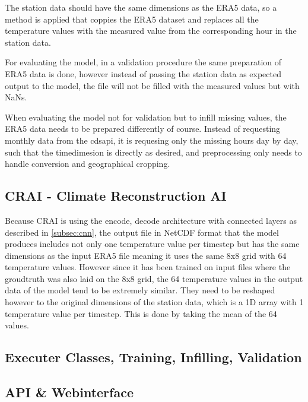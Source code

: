The station data should have the same dimensions as the ERA5 data, so a method is applied that coppies the ERA5 dataset and replaces all the temperature values with the measured value from the corresponding hour in the station data.

For evaluating the model, in a validation procedure the same preparation of ERA5 data is done, however instead of passing the station data as expected output to the model, the file will not be filled with the measured values but with NaNs.

When evaluating the model not for validation but to infill missing values, the ERA5 data needs to be prepared differently of course. Instead of requesting monthly data from the cdsapi, it is requesing only the missing hours day by day, such that the timedimesion is directly as desired, and preprocessing only needs to handle conversion and geographical cropping.

\subsection{CRAI - Climate Reconstruction AI}

Because CRAI is using the encode, decode architecture with connected layers as described in \autoref{subsec:cnn}, the output file in NetCDF format that the model produces includes not only one temperature value per timestep but has the same dimensions as the input ERA5 file meaning it uses the same 8x8 grid with 64 temperature values. However since it has been trained on input files where the groudtruth was also laid on the 8x8 grid, the 64 temperature values in the output data of the model tend to be extremely similar. They need to be reshaped however to the original dimensions of the station data, which is a 1D array with 1 temperature value per timestep. This is done by taking the mean of the 64 values. 

\subsection{Executer Classes, Training, Infilling, Validation}

\subsection{API \& Webinterface}

